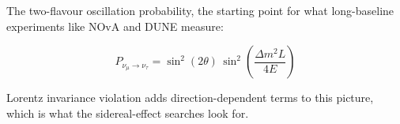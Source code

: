 The two-flavour oscillation probability, the starting point for what
long-baseline experiments like NOvA and DUNE measure:

\[
P_{\nu_\mu \to \nu_\tau} = \sin^2(2\theta)\,
\sin^2\!\left(\frac{\Delta m^2 L}{4E}\right)
\]

Lorentz invariance violation adds direction-dependent terms to this picture,
which is what the sidereal-effect searches look for.
